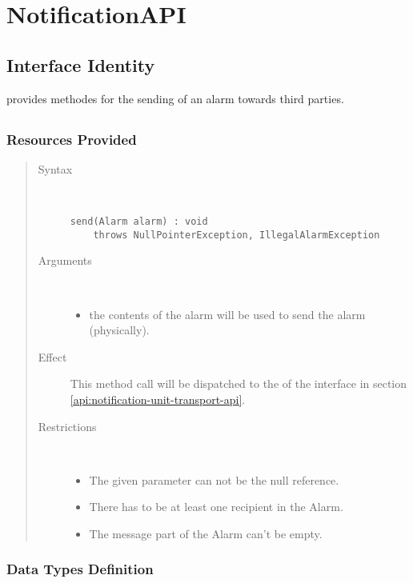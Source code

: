 \section{NotificationAPI}
\label{api:notifcation-api}

\subsection{Interface Identity}

\npar {} provides methodes for the sending of an alarm
towards third parties.

\subsection{}

\subsubsection{Resources Provided}

\begin{quote}
	\begin{description}
		\item[Syntax] \
		\begin{verbatim}
send(Alarm alarm) : void
    throws NullPointerException, IllegalAlarmException
		\end{verbatim}
		\item[Arguments] \
		\begin{itemize}
		  \item the contents of the alarm will be used to send the alarm (physically). 
		\end{itemize}
		\item[Effect] This method call will be dispatched to the 
		of the interface in section \ref{api:notification-unit-transport-api}.
		\item[Restrictions] \
		\begin{itemize}
		  \item The given parameter can not be the null reference.
		  \item There has to be at least one recipient in the Alarm.
		  \item The message part of the Alarm can't be empty.
		\end{itemize}
	\end{description} 
\end{quote}

\subsubsection{Data Types Definition}


